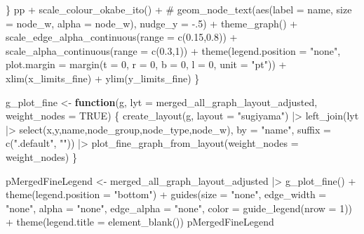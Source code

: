 \documentclass[
  letterpaper,
  DIV=11,
  numbers=noendperiod]{scrartcl}
\newenvironment{Shaded}{\begin{snugshade}}{\end{snugshade}}
\newcommand{\AttributeTok}[1]{\textcolor[rgb]{0.40,0.45,0.13}{#1}}
\newcommand{\CommentTok}[1]{\textcolor[rgb]{0.37,0.37,0.37}{#1}}
\newcommand{\ConstantTok}[1]{\textcolor[rgb]{0.56,0.35,0.01}{#1}}
\newcommand{\ControlFlowTok}[1]{\textcolor[rgb]{0.00,0.23,0.31}{\textbf{#1}}}
\newcommand{\DecValTok}[1]{\textcolor[rgb]{0.68,0.00,0.00}{#1}}
\newcommand{\FloatTok}[1]{\textcolor[rgb]{0.68,0.00,0.00}{#1}}
\newcommand{\FunctionTok}[1]{\textcolor[rgb]{0.28,0.35,0.67}{#1}}
\newcommand{\NormalTok}[1]{\textcolor[rgb]{0.00,0.23,0.31}{#1}}
\newcommand{\OtherTok}[1]{\textcolor[rgb]{0.00,0.23,0.31}{#1}}
\newcommand{\SpecialCharTok}[1]{\textcolor[rgb]{0.37,0.37,0.37}{#1}}
\newcommand{\StringTok}[1]{\textcolor[rgb]{0.13,0.47,0.30}{#1}}
\begin{document}
\begin{Shaded}
\begin{Highlighting}[]
\NormalTok{    \}}
\NormalTok{    pp }\SpecialCharTok{+}
        \FunctionTok{scale\_colour\_okabe\_ito}\NormalTok{() }\SpecialCharTok{+}
        \CommentTok{\# geom\_node\_text(aes(label = name, size = node\_w, alpha = node\_w), nudge\_y = {-}.5) +}
        \FunctionTok{theme\_graph}\NormalTok{() }\SpecialCharTok{+}
        \FunctionTok{scale\_edge\_alpha\_continuous}\NormalTok{(}\AttributeTok{range =} \FunctionTok{c}\NormalTok{(}\FloatTok{0.15}\NormalTok{,}\FloatTok{0.8}\NormalTok{)) }\SpecialCharTok{+}
        \FunctionTok{scale\_alpha\_continuous}\NormalTok{(}\AttributeTok{range =} \FunctionTok{c}\NormalTok{(}\FloatTok{0.3}\NormalTok{,}\DecValTok{1}\NormalTok{)) }\SpecialCharTok{+}
        \FunctionTok{theme}\NormalTok{(}\AttributeTok{legend.position =} \StringTok{"none"}\NormalTok{,}
              \AttributeTok{plot.margin =} \FunctionTok{margin}\NormalTok{(}\AttributeTok{t =} \DecValTok{0}\NormalTok{, }\AttributeTok{r =} \DecValTok{0}\NormalTok{, }\AttributeTok{b =} \DecValTok{0}\NormalTok{, }\AttributeTok{l =} \DecValTok{0}\NormalTok{, }\AttributeTok{unit =} \StringTok{"pt"}\NormalTok{)) }\SpecialCharTok{+}
        \FunctionTok{xlim}\NormalTok{(x\_limits\_fine) }\SpecialCharTok{+}
        \FunctionTok{ylim}\NormalTok{(y\_limits\_fine)}
\NormalTok{\}}

\NormalTok{g\_plot\_fine }\OtherTok{\textless{}{-}} \ControlFlowTok{function}\NormalTok{(g, }\AttributeTok{lyt =}\NormalTok{ merged\_all\_graph\_layout\_adjusted, }\AttributeTok{weight\_nodes =} \ConstantTok{TRUE}\NormalTok{) \{}
    \FunctionTok{create\_layout}\NormalTok{(g, }\AttributeTok{layout =} \StringTok{"sugiyama"}\NormalTok{) }\SpecialCharTok{|\textgreater{}} 
        \FunctionTok{left\_join}\NormalTok{(lyt }\SpecialCharTok{|\textgreater{}} \FunctionTok{select}\NormalTok{(x,y,name,node\_group,node\_type,node\_w), }\AttributeTok{by =} \StringTok{"name"}\NormalTok{,}
                  \AttributeTok{suffix =} \FunctionTok{c}\NormalTok{(}\StringTok{".default"}\NormalTok{, }\StringTok{""}\NormalTok{)) }\SpecialCharTok{|\textgreater{}} 
        \FunctionTok{plot\_fine\_graph\_from\_layout}\NormalTok{(}\AttributeTok{weight\_nodes =}\NormalTok{ weight\_nodes)}
\NormalTok{\}}

\NormalTok{pMergedFineLegend }\OtherTok{\textless{}{-}}\NormalTok{ merged\_all\_graph\_layout\_adjusted }\SpecialCharTok{|\textgreater{}} 
    \FunctionTok{g\_plot\_fine}\NormalTok{() }\SpecialCharTok{+} 
    \FunctionTok{theme}\NormalTok{(}\AttributeTok{legend.position =} \StringTok{"bottom"}\NormalTok{) }\SpecialCharTok{+}
    \FunctionTok{guides}\NormalTok{(}\AttributeTok{size =} \StringTok{"none"}\NormalTok{, }\AttributeTok{edge\_width =} \StringTok{"none"}\NormalTok{, }\AttributeTok{alpha =} \StringTok{"none"}\NormalTok{, }\AttributeTok{edge\_alpha =} \StringTok{"none"}\NormalTok{,}
           \AttributeTok{color =} \FunctionTok{guide\_legend}\NormalTok{(}\AttributeTok{nrow =} \DecValTok{1}\NormalTok{)) }\SpecialCharTok{+}
    \FunctionTok{theme}\NormalTok{(}\AttributeTok{legend.title =} \FunctionTok{element\_blank}\NormalTok{())}
\NormalTok{pMergedFineLegend}
\end{Highlighting}
\end{Shaded}
\end{document}
